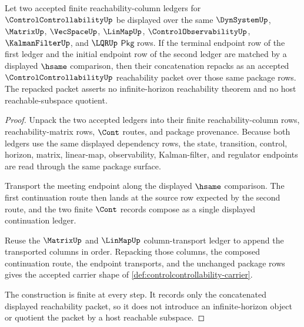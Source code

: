 \begin{theorem}
\label{thm:controlcontrollability-continuation-closure}
Let two accepted finite reachability-column ledgers for $\ControlControllabilityUp$ be displayed over the same $\DynSystemUp$, $\MatrixUp$, $\VecSpaceUp$, $\LinMapUp$, $\ControlObservabilityUp$, $\KalmanFilterUp$, and $\LQRUp$ $\mathsf{Pkg}$ rows. If the terminal endpoint row of the first ledger and the initial endpoint row of the second ledger are matched by a displayed $\hsame$ comparison, then their concatenation repacks as an accepted $\ControlControllabilityUp$ reachability packet over those same package rows. The repacked packet asserts no infinite-horizon reachability theorem and no host reachable-subspace quotient.
\end{theorem}
\begin{proof}
Unpack the two accepted ledgers into their finite reachability-column rows, reachability-matrix rows, $\Cont$ routes, and package provenance. Because both ledgers use the same displayed dependency rows, the state, transition, control, horizon, matrix, linear-map, observability, Kalman-filter, and regulator endpoints are read through the same package surface.

Transport the meeting endpoint along the displayed $\hsame$ comparison. The first continuation route then lands at the source row expected by the second route, and the two finite $\Cont$ records compose as a single displayed continuation ledger.

Reuse the $\MatrixUp$ and $\LinMapUp$ column-transport ledger to append the transported columns in order. Repacking those columns, the composed continuation route, the endpoint transports, and the unchanged package rows gives the accepted carrier shape of \autoref{def:controlcontrollability-carrier}.

The construction is finite at every step. It records only the concatenated displayed reachability packet, so it does not introduce an infinite-horizon object or quotient the packet by a host reachable subspace.
\end{proof}

